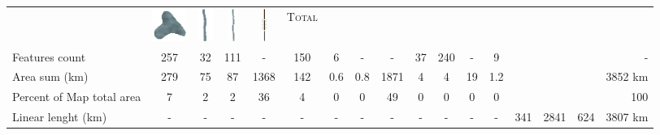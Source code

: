 \documentclass[portrait, A0]{sciposter}
\begin{document}
\begin{minipage}[b]{75cm}
\begin{multicols}{3}
\begin{tabular}{l|cccccccc|c|ccccc|c|r}
&\includegraphics[height=30pt]{gfx/lac_couleur.png}
&\includegraphics[height=30pt]{gfx/riviere_medium_couleur.png}
&\includegraphics[height=30pt]{gfx/riviere_small_couleur.png}
&\includegraphics[height=30pt]{gfx/routes_couleur.png}
&\textsc{Total}\\
Features count&257&32&111&-&150&6&-&-&37&240&-&9&&&&-\\
Area sum (km\up{2})&\num{279}&\num{75}&\num{87}&\num{1368}&\num{142}&\num{0,6}&\num{0,8}&\num{1871}&\num{4}&\num{4}&\num{19}&\num{1,2}&&&&\num{3852} km\up{2}\\
Percent of Map total area&7&2&2&36&4&0&0&49&0&0&0&0&&&&100\\
Linear lenght (km)&-&-&-&-&-&-&-&-&-&-&-&-&\num{341}&\num{2841}&\num{624}&\num{3807} km
\end{tabular}


\footnotesize


\end{multicols}
\end{minipage}
\end{document}
